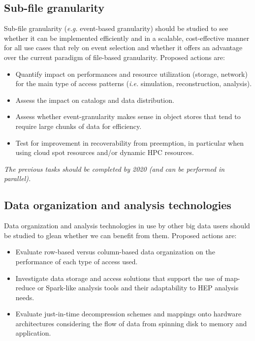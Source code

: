 \documentclass[12pt,a4paper]{article}
\begin{document}
\subsection{Sub-file granularity}\label{sub-file-granularity}
Sub-file granularity ({\it e.g.} event-based granularity) should be studied
to see whether it can be implemented efficiently and in a scalable, cost-effective
manner for all use cases that rely on event selection and whether it offers an advantage
over the current paradigm of file-based granularity. Proposed actions are:

\begin{itemize}
\item Quantify impact on performances
  and resource utilization (storage, network) for the main type of
  access patterns ({\it i.e.} simulation, reconstruction, analysis).
\item Assess the impact on catalogs and
  data distribution.
\item Assess whether
  event-granularity makes sense in object stores that tend to require
  large chunks of data for efficiency.
\item Test for improvement in recoverability
  from preemption, in particular when using cloud spot resources and/or
  dynamic HPC resources.
\end{itemize}

\emph{The previous tasks should be completed by 2020 (and can be performed in parallel).}

\subsection{Data organization and analysis
technologies}\label{data-organization-and-analysis}
Data organization and analysis technologies in use by other big data users should be studied
to glean whether we can benefit from them. Proposed actions are:

\begin{itemize}
\item Evaluate row-based versus column-based
  data organization on the performance of each type of access used.
\item Investigate data storage and access solutions that support the use of map-reduce or
Spark-like analysis tools and their adaptability to HEP analysis needs.
\item Evaluate just-in-time
  decompression schemes and mappings onto hardware architectures
  considering the flow of data from spinning disk to memory and
  application.
\end{itemize}
\end{document}
